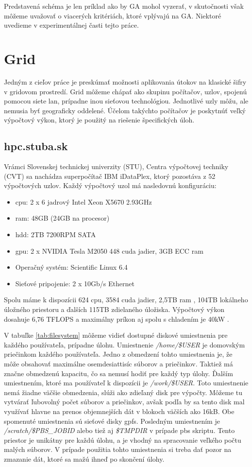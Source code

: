 Predstavená schéma je len príklad ako by GA mohol vyzerať, v skutočnosti však môžeme uvažovať o viacerých kritériách, ktoré vplývajú na GA.
Niektoré uvedieme v experimentálnej časti tejto práce.

\section{Grid}
Jedným z cieľov práce je preskúmať možnosti aplikovania útokov na klasické šifry v gridovom prostredí.
Grid môžeme chápať ako skupinu počítačov, uzlov, spojenú pomocou siete \acrfull{lan}, prípadne inou sieťovou technológiou.
Jednotlivé uzly môžu, ale nemusia byť geograficky oddelené.
Účelom takýchto počítačov je poskytnúť veľký výpočtový výkon, ktorý je použitý na riešenie špecifických úloh.

\subsection{hpc.stuba.sk}
Vrámci Slovenskej technickej univerzity (STU), Centra výpočtovej techniky (CVT) sa nachádza superpočítač IBM iDataPlex, ktorý pozostáva z 52 výpočtových uzlov.
Každý výpočtový uzol má nasledovnú konfiguráciu:
\begin{itemize}
\item \acrshort{cpu}: 2 x 6 jadrový Intel Xeon X5670 2.93GHz
\item \acrshort{ram}: 48GB (24GB na procesor)
\item \acrshort{hdd}: 2TB 7200RPM SATA
\item \acrshort{gpu}: 2 x NVIDIA Tesla M2050 448 cuda jadier, 3GB ECC \acrshort{ram}
\item Operačný systém: Scientific Linux 6.4
\item Sieťové pripojenie: 2 x 10Gb/s Ethernet
\end{itemize}
Spolu máme k dispozícii 624 \acrshort{cpu}, 3584 cuda jadier, 2,5TB \acrshort{ram} , 104TB lokálneho úložného priestoru a ďalších 115TB zdielaného úložiska.
Výpočtový výkon dosahuje 6,76 TFLOPS a maximálny príkon aj spolu s chladením je 40kW \cite{hpc}.

V tabuľke \ref{tab:filesystem} môžeme vidieť dostupné diskové umiestnenia pre každého používateľa, prípadne úlohu.
Umiestnenie \textit{/home/\$USER} je domovským priečinkom každého používateľa.
Jedno z obmedzení tohto umiestnenia je, že môže obsahovať maximálne osemdesiattisíc súborov a priečinkov.
Taktiež má značne obmedzenú kapacitu, čo sa nemusí hodiť pre každý typ úlohy.
Ďalším umiestnením, ktoré ma používateľ k dispozícii je \textit{/work/\$USER}.
Toto umiestnenie nemá žiadne väčšie obmedzenia, slúži ako zdieľaný disk pre výpočty.
Môžeme tu vytvárať ľubovolný počet súborov a priečinkov, avšak podľa \cite{hpc} by sa tento disk mal využívať hlavne na prenos objemnejších dát v blokoch väčších ako 16kB. Obe spomenuté umiestnenia sú sieťové disky \acrshort{gpfs}.
Posledným umiestnením je \textit{/scratch/\$PBS\_JOBID} alebo tiež aj \textit{\$TMPDIR} v prípade \acrshort{pbs} skriptu.
Tento priestor je unikátny pre každú úlohu, a je vhodný na spracovanie veľkého počtu malých súborov.
V prípade použitia tohto umiestnenia si treba dať pozor na zmazanie dát, ktoré sa mažú ihneď po skončení úlohy.

